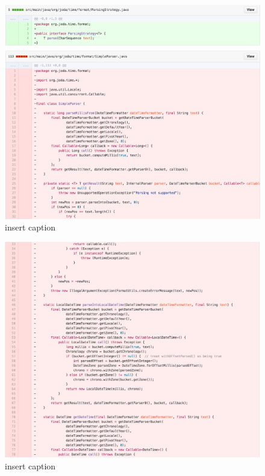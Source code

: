 \begin{figure}[H]
	\centering
	\includegraphics[width=\linewidth]{code108}
	\caption{insert caption}
\end{figure}
\begin{figure}[H]
	\centering
	\includegraphics[width=\linewidth]{code109}
	\caption{insert caption}
\end{figure}

